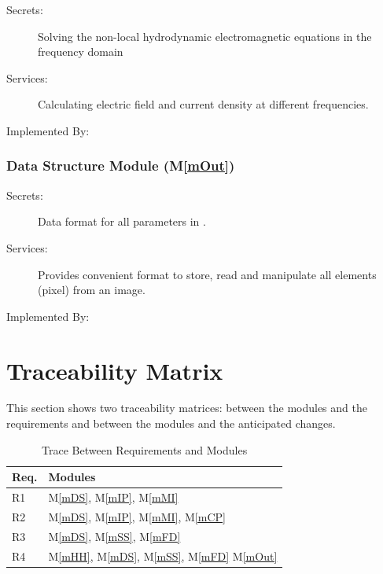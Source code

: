 \documentclass[12pt, titlepage]{article}
\newcommand{\mref}[1]{M\ref{#1}}
\begin{document}
	\begin{description} \item[Secrets:]Solving the non-local hydrodynamic
		electromagnetic equations in the frequency domain \item[Services:]Calculating
		electric field and current density at different frequencies. \item[Implemented
		By:] \progname{} \end{description}
	
	
	\subsubsection{Data Structure Module (\mref{mOut})}
	
	\begin{description} \item[Secrets:]Data format for all parameters in
		\progname{}. \item[Services:]Provides convenient format to store, read and
		manipulate all elements (pixel) from an image. \item[Implemented By:]
		\progname{} \end{description}
	
	
	
	\section{Traceability Matrix} \label{SecTM}
	
	This section shows two traceability matrices: between the modules and the
	requirements and between the modules and the anticipated changes.
	
	\begin{table}[H] \centering \begin{tabular}{p{} p{}}
			\toprule \textbf{Req.} & \textbf{Modules}\\ \midrule R1 & M\ref{mDS},
			M\ref{mIP}, M\ref{mMI}\\ R2 & M\ref{mDS}, M\ref{mIP}, M\ref{mMI}, M\ref{mCP}\\
			R3 & M\ref{mDS}, M\ref{mSS}, M\ref{mFD}\\ R4 & M\ref{mHH}, M\ref{mDS},
			M\ref{mSS}, M\ref{mFD} M\ref{mOut}\\ \bottomrule \end{tabular} \caption{Trace
			Between Requirements and Modules} \label{TblRT} \end{table}
	
\end{document}
